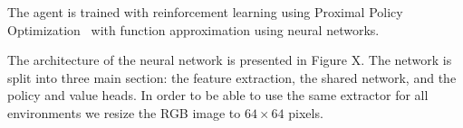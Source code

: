 The agent is trained with reinforcement learning using Proximal Policy Optimization~\cite{proxim} with function approximation using neural networks.









The architecture of the neural network is presented in Figure X.
The network is split into three main section: the feature extraction, the shared network, and the policy and value heads.
In order to be able to use the same extractor for all environments we resize the RGB image to \(64 \times 64\) pixels.





